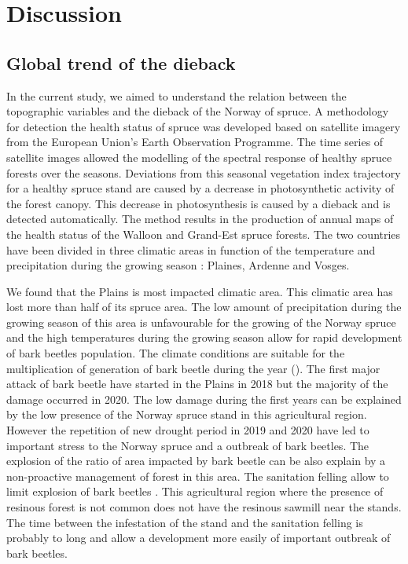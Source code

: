 \documentclass[3p,procedia]{elsarticle}
\begin{document}
\fi
 
  

\section{Discussion}

\subsection{Global trend of the dieback}

In the current study, we aimed to understand the relation between the topographic variables and the dieback of the Norway of spruce.
A methodology for detection the health status of spruce was developed based on satellite imagery from the European Union's Earth Observation Programme. The time series of satellite images allowed the modelling of the spectral response of healthy spruce forests over the seasons. 
Deviations from this seasonal vegetation index trajectory for a healthy spruce stand are caused by a decrease in photosynthetic activity of the forest canopy.
This decrease in photosynthesis is caused by a dieback and is detected automatically.
The method results in the production of annual maps of the health status of the Walloon and Grand-Est spruce forests.
The two countries have been divided in three climatic areas in function of the temperature and precipitation during the growing season : Plaines, Ardenne and Vosges.

We found that the Plains is most impacted climatic area.
This climatic area has lost more than half of its spruce area.
The low amount of precipitation during the growing season of this area is unfavourable for the growing of the Norway spruce and the high temperatures during the growing season allow for rapid development of bark beetles population.
The climate conditions are suitable for the multiplication of generation of bark beetle during the year (\citep{annila_influence_1969,baier_phenipscomprehensive_2007}).
The first major attack of bark beetle have started in the Plains in 2018 but the majority of the damage occurred in 2020. 
The low damage during the first years can be explained by the low presence of the Norway spruce stand in this agricultural region.
However the repetition of new drought period in 2019 and 2020 have led to important stress to the Norway spruce and a outbreak of bark beetles. 
The explosion of the ratio of area impacted by bark beetle can be also explain by a non-proactive management of forest in this area.
The sanitation felling allow to limit explosion of bark beetles \citep{stadelmann_effects_2013}.
This agricultural region where the presence of resinous forest is not common does not have the resinous sawmill near the stands.  
The time between the infestation of the stand and the sanitation felling is probably to long and allow a development more easily of important outbreak of bark beetles.
\end{document}
